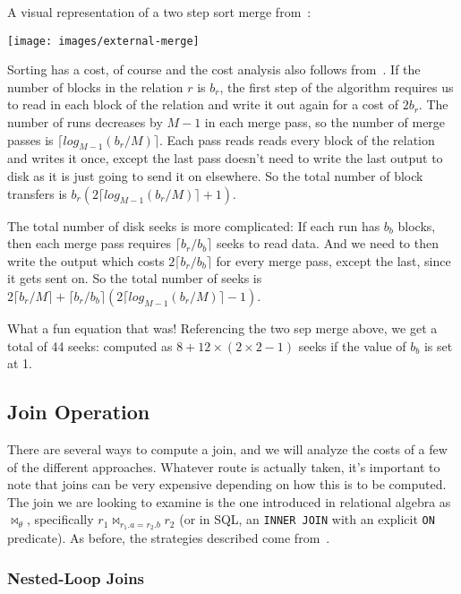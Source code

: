 \documentclass[a4paper]{report}
\begin{document}
A visual representation of a two step sort merge from~\cite{dsc}:

\begin{center}
	\texttt{[image: images/external-merge]}
\end{center}

Sorting has a cost, of course and the cost analysis also follows from~\cite{dsc}. If the number of blocks in the relation $r$ is $b_{r}$, the first step of the algorithm requires us to read in each block of the relation and write it out again for a cost of $2b_{r}$. The number of runs decreases by $M-1$ in each merge pass, so the number of merge passes is $\lceil log_{M-1}(b_{r}/M)\rceil$. Each pass reads reads every block of the relation and writes it once, except the last pass doesn't need to write the last output to disk as it is just going to send it on elsewhere. So the total number of block transfers is $b_{r}(2\lceil log_{M-1}(b_{r}/M)\rceil + 1)$. 

The total number of disk seeks is more complicated: If each run has $b_{b}$ blocks, then each merge pass requires $\lceil b_{r}/b_{b}\rceil$ seeks to read data. And we need to then write the output which costs  $2\lceil b_{r}/b_{b}\rceil$ for every merge pass, except the last, since it gets sent on. So the total number of seeks is $2\lceil b_{r}/M\rceil + \lceil b_{r}/b_{b}\rceil(2 \lceil log_{M-1}(b_{r}/M)\rceil - 1)$.

What a fun equation that was! Referencing the two sep merge above, we get a total of 44 seeks: computed as $8 + 12 \times (2 \times 2 - 1)$ seeks if the value of $b_{b}$ is set at 1.

\subsection*{Join Operation}

There are several ways to compute a join, and we will analyze the costs of a few of the different approaches. Whatever route is actually taken, it's important to note that joins can be very expensive depending on how this is to be computed. The join we are looking to examine is the one introduced in relational algebra as $\Join_{\theta}$, specifically $r_{1} \Join_{r_{1}.a = r_{2}.b} r_{2}$ (or in SQL, an \texttt{INNER JOIN} with an explicit \texttt{ON} predicate). As before, the strategies described come from~\cite{dsc}.

\subsubsection*{Nested-Loop Joins}
\end{document}
